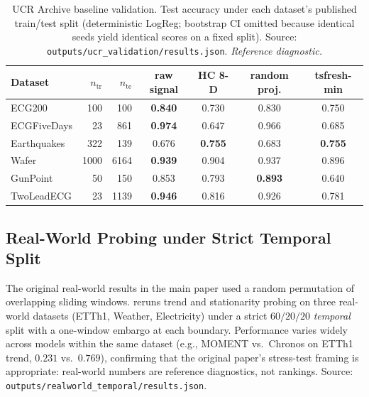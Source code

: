 \documentclass{article}
\begin{document}
\begin{table}[htbp]
\caption{UCR Archive baseline validation. Test accuracy under each dataset's
published train/test split (deterministic LogReg; bootstrap CI omitted because
identical seeds yield identical scores on a fixed split). Source:
\texttt{outputs/ucr\_validation/results.json}. \emph{Reference diagnostic.}}
\label{tab:ucr_validation}
\centering
\small
\begin{tabular}{lrrcccc}
\toprule
Dataset & $n_{\text{tr}}$ & $n_{\text{te}}$ & raw signal & HC 8-D & random proj. & tsfresh-min \\
\midrule
ECG200       & 100  & 100  & \textbf{0.840} & 0.730 & 0.830 & 0.750 \\
ECGFiveDays  & 23   & 861  & \textbf{0.974} & 0.647 & 0.966 & 0.685 \\
Earthquakes  & 322  & 139  & 0.676          & \textbf{0.755} & 0.683 & \textbf{0.755} \\
Wafer        & 1000 & 6164 & \textbf{0.939} & 0.904 & 0.937 & 0.896 \\
GunPoint     & 50   & 150  & 0.853          & 0.793 & \textbf{0.893} & 0.640 \\
TwoLeadECG   & 23   & 1139 & \textbf{0.946} & 0.816 & 0.926 & 0.781 \\
\bottomrule
\end{tabular}
\end{table}

\subsection{Real-World Probing under Strict Temporal Split}
\label{sec:realworld_temporal}

The original real-world results in the main paper used a random permutation of overlapping sliding windows.  reruns trend and stationarity probing on three real-world datasets (ETTh1, Weather, Electricity) under a strict $60/20/20$ \emph{temporal} split with a one-window embargo at each boundary. Performance varies widely across models within the same dataset (e.g., MOMENT vs.\ Chronos on ETTh1 trend, $0.231$ vs.\ $0.769$), confirming that the original paper's stress-test framing is appropriate: real-world numbers are reference diagnostics, not rankings. Source: \texttt{outputs/realworld\_temporal/results.json}.
\end{document}
